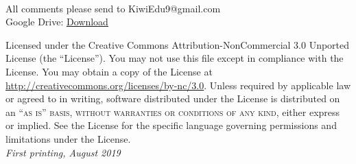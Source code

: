 \documentclass[11pt,fleqn]{book} %
\begin{document}

\begingroup
\thispagestyle{empty}
\vfill
\endgroup


\newpage
~\vfill
\thispagestyle{empty}

\noindent All comments please send to KiwiEdu9@gmail.com\\ %


\noindent Google Drive: \href{https://drive.google.com/file/d/1hogR7qiz_hWrtKSVcBulC4TjvUvE9Eq5/view?usp=sharing}{Download}


\noindent Licensed under the Creative Commons Attribution-NonCommercial 3.0 Unported License (the ``License''). You may not use this file except in compliance with the License. You may obtain a copy of the License at \url{http://creativecommons.org/licenses/by-nc/3.0}. Unless required by applicable law or agreed to in writing, software distributed under the License is distributed on an \textsc{``as is'' basis, without warranties or conditions of any kind}, either express or implied. See the License for the specific language governing permissions and limitations under the License.\\ %

\noindent \textit{First printing, August 2019} %

\end{document}
